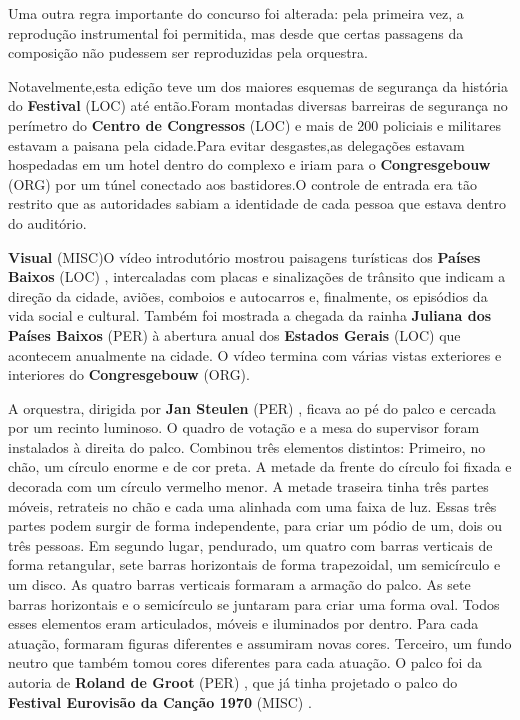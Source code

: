 \documentclass[12pt,a4paper]{article}
\begin{document}
Uma outra regra importante do concurso foi alterada: pela primeira vez, a reprodução instrumental foi permitida, mas desde que certas passagens da composição não pudessem ser reproduzidas pela orquestra.

Notavelmente,esta edição teve um dos maiores esquemas de segurança da história do \textbf{Festival} (LOC) até então.Foram montadas diversas barreiras de segurança no perímetro do \textbf{Centro de Congressos} (LOC) e mais de 200 policiais e militares estavam a paisana pela cidade.Para evitar desgastes,as delegações estavam hospedadas em um hotel dentro do complexo e iriam para o \textbf{Congresgebouw} (ORG) por um túnel conectado aos bastidores.O controle de entrada era tão restrito que as autoridades sabiam a identidade de cada pessoa que estava dentro do auditório.



\textbf{Visual} (MISC)O vídeo introdutório mostrou paisagens turísticas dos \textbf{Países Baixos} (LOC) , intercaladas com placas e sinalizações de trânsito que indicam a direção da cidade, aviões, comboios e autocarros e, finalmente, os episódios da vida social e cultural. Também foi mostrada a chegada da rainha \textbf{Juliana dos Países Baixos} (PER) à abertura anual dos \textbf{Estados Gerais} (LOC) que acontecem anualmente na cidade. O vídeo termina com várias vistas exteriores e interiores do \textbf{Congresgebouw} (ORG).

A orquestra, dirigida por \textbf{Jan Steulen} (PER) , ficava ao pé do palco e cercada por um recinto luminoso. O quadro de votação e a mesa do supervisor foram instalados à direita do palco. Combinou três elementos distintos: Primeiro, no chão, um círculo enorme e de cor preta. A metade da frente do círculo foi fixada e decorada com um círculo vermelho menor. A metade traseira tinha três partes móveis, retrateis no chão e cada uma alinhada com uma faixa de luz. Essas três partes podem surgir de forma independente, para criar um pódio de um, dois ou três pessoas. Em segundo lugar, pendurado, um quatro com barras verticais de forma retangular, sete barras horizontais de forma trapezoidal, um semicírculo e um disco. As quatro barras verticais formaram a armação do palco. As sete barras horizontais e o semicírculo se juntaram para criar uma forma oval. Todos esses elementos eram articulados, móveis e iluminados por dentro. Para cada atuação, formaram figuras diferentes e assumiram novas cores. Terceiro, um fundo neutro que também tomou cores diferentes para cada atuação. O palco foi da autoria de \textbf{Roland de Groot} (PER) , que já tinha projetado o palco do \textbf{Festival Eurovisão da Canção 1970} (MISC) .
\end{document}
